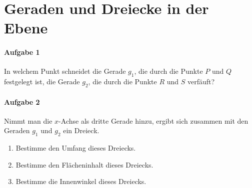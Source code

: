 \documentclass
[
  draft    = true,
  fontsize = 11pt,
  parskip  = half-,
  BCOR     = 0pt,
  DIV      = 11,
  ngerman
]
{scrartcl}
\begin{document}

\section*{Geraden und Dreiecke in der Ebene}

\paragraph{Aufgabe 1}
In welchem Punkt schneidet die Gerade $g_1$, die durch die Punkte $P$
und $Q$ festgelegt ist, die Gerade $g_2$, die durch die Punkte $R$ und
$S$ verfäuft?

\paragraph{Aufgabe 2}
Nimmt man die $x$-Achse als dritte Gerade hinzu, ergibt sich zusammen
mit den Geraden $g_1$ und $g_2$ ein Dreieck.
\begin{enumerate}[{2}.1]
  \item Bestimme den Umfang dieses Dreiecks.
  \item Bestimme den Flächeninhalt dieses Dreiecks.
  \item Bestimme die Innenwinkel dieses Dreiecks.
\end{enumerate}

\hrulefill



\clearpage



\end{document}
